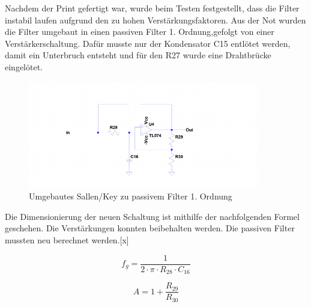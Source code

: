\begin{minipage}[h]{0.5\textwidth}
Nachdem der Print gefertigt war, wurde beim Testen festgestellt, dass die Filter instabil laufen aufgrund den zu hohen Verstärkungsfaktoren. Aus der Not wurden die Filter umgebaut in einen passiven Filter 1. Ordnung,gefolgt von einer Verstärkerschaltung. Dafür musste nur der Kondensator C15 entlötet werden, damit ein Unterbruch entsteht und für den R27 wurde eine Drahtbrücke eingelötet.
\end{minipage}
\begin{minipage}[h]{0.5\textwidth} 
\begin{figure}[H]
\begin{center}
\includegraphics[width=0.9\textwidth]{images/Analoge_Schaltung_Sallentopassive.png}
\caption{Umgebautes Sallen/Key zu passivem Filter 1. Ordnung}
\end{center}
\end{figure}
\end{minipage}

Die Dimensionierung der neuen Schaltung ist mithilfe der nachfolgenden Formel geschehen. Die Verstärkungen konnten beibehalten werden. Die passiven Filter mussten neu berechnet werden.[x]

\begin{minipage}[h]{0.5\textwidth}
\begin{equation}
f_g=\frac{1}{2 \cdot \pi \cdot R_{28} \cdot C_{16}}
\label{eq:Grenzfrequenz}
\end{equation}

\end{minipage}
\begin{minipage}[h]{0.5\textwidth} 
\begin{equation}
A=1+\frac{R_{29}}{R_{30}}
\label{eq:Verstärkung}
\end{equation}
\end{minipage}

